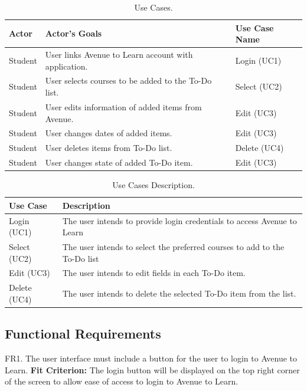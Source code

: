 \documentclass[12pt, titlepage]{article}
\begin{document}
\begin{table}[H]
\caption{Use Cases.}
\begin{center}
\begin{tabular}{ |m{4em}|m{18em}|m{8em}|} 
 \hline
 Actor & Actor’s Goals & Use Case Name \\ 
 \hline
 Student & User links Avenue to Learn account with application. & Login (UC1) \\
 \hline
 Student & User selects courses to be added to the To-Do list. & Select (UC2) \\ 
 \hline
 Student & User edits information of added items from Avenue. & Edit (UC3) \\
 \hline 
 Student & User changes dates of added items. & Edit (UC3) \\
 \hline 
 Student & User deletes items from To-Do list. & Delete (UC4) \\
 \hline 
 Student & User changes state of added To-Do item. & Edit (UC3) \\
 \hline 
\end{tabular}
\end{center}
\label{uc}
\end{table}

\begin{table}[H]
\caption{Use Cases Description.}
\begin{center}
\begin{tabular}{ |m{4em}|m{26em}| } 
 \hline
 Use Case & Description \\ 
 \hline
 Login (UC1) & The user intends to provide login credentials to access Avenue to Learn \\
 \hline
 Select (UC2) & The user intends to select the preferred courses to add to the To-Do list \\ 
 \hline
 Edit (UC3) & The user intends to edit fields in each To-Do item.\\
 \hline 
 Delete (UC4) & The user intends to delete the selected To-Do item from the list.\\
 \hline
\end{tabular}
\end{center}
\label{ucd}
\end{table}

\subsection{Functional Requirements}

FR1. The user interface must include a button for the user to login to Avenue to Learn.
	\textbf{Fit Criterion:} The login button will be displayed on the top right corner of the screen to 
	allow ease of access to login to Avenue to Learn.\\
\end{document}
